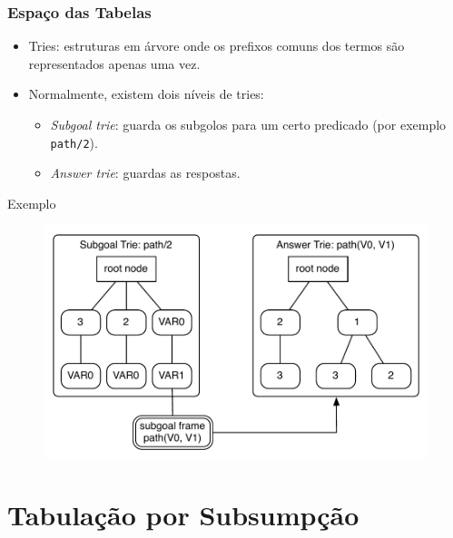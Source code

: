 \documentclass{beamer}
\begin{document}
\begin{frame}
   \frametitle{Espaço das Tabelas}
   \begin{itemize}
      \item Tries: estruturas em árvore onde os prefixos comuns dos termos são representados apenas uma vez.
      \pause
      \item Normalmente, existem dois níveis de tries:
         \begin{itemize}
            \item \emph{Subgoal trie}: guarda os subgolos para um certo predicado (por exemplo \texttt{path/2}).
            \item \emph{Answer trie}: guardas as respostas.
         \end{itemize}
      \pause
   \end{itemize}
   \begin{block}{Exemplo}
     \begin{figure}[ht]
        \centering
          \includegraphics[scale=0.45]{two_level_tries.pdf}
      \end{figure}
    \end{block}
\end{frame}

\section{Tabulação por Subsumpção}
\end{document}
